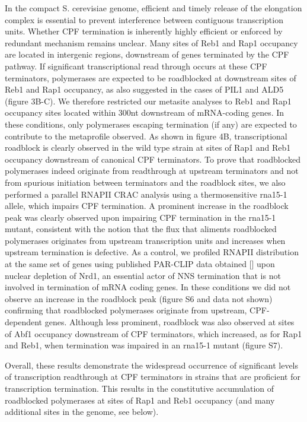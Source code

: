 In the compact S. cerevisiae genome, efficient and timely release of the elongation complex is essential to prevent interference between contiguous transcription units. Whether CPF termination is inherently highly efficient or enforced by redundant mechanism remains unclear. Many sites of Reb1 and Rap1 occupancy are located in intergenic regions, downstream of genes terminated by the CPF pathway. If significant transcriptional read through occurs at these CPF terminators, polymerases are expected to be roadblocked at downstream sites of Reb1 and Rap1 occupancy, as also suggested in the cases of PIL1 and ALD5 (figure 3B-C). We therefore restricted our metasite analyses to Reb1 and Rap1 occupancy sites located within 300nt downstream of mRNA-coding genes. In these conditions, only polymerases escaping termination (if any) are expected to contribute to the metaprofile observed. As shown in figure 4B, transcriptional roadblock is clearly observed in the wild type strain at sites of Rap1 and Reb1 occupancy downstream of canonical CPF terminators. To prove that roadblocked polymerases indeed originate from readthrough at upstream terminators and not from spurious initiation between terminators and the roadblock sites, we also performed a parallel RNAPII CRAC analysis using a thermosensitive rna15-1 allele, which impairs CPF termination.  A prominent increase in the roadblock peak was clearly observed upon impairing CPF termination in the rna15-1 mutant, consistent with the notion that the flux that aliments roadblocked polymerases originates from upstream transcription units and increases when upstream termination is defective. As a control, we profiled RNAPII distribution at the same set of genes using published PAR-CLIP data obtained [] upon nuclear depletion of Nrd1, an essential actor of NNS termination that is not involved in termination of mRNA coding genes. In these conditions we did not observe an increase in the roadblock peak (figure S6 and data not shown) confirming that roadblocked polymerases originate from upstream, CPF-dependent genes. 
Although less prominent, roadblock was also observed at sites of Abf1 occupancy downstream of CPF terminators, which increased, as for Rap1 and Reb1, when termination was impaired in an rna15-1 mutant (figure S7). 

Overall, these results demonstrate the widespread occurrence of significant levels of transcription readthrough at CPF terminators in strains that are proficient for transcription termination. This results in the constitutive accumulation of roadblocked polymerases at sites of Rap1 and Reb1 occupancy (and many additional sites in the genome, see below).


